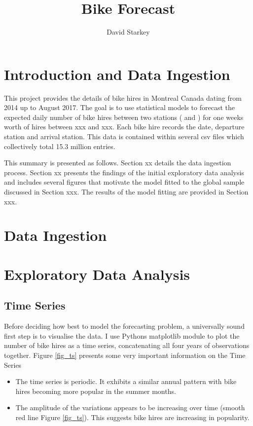 \documentclass[10pt]{article}
\begin{document}
\title{Bike Forecast}

\author{David Starkey}

\maketitle





\section{Introduction and Data Ingestion}
This project provides the details of bike hires in Montreal Canada dating from 2014 up to August 2017. The goal is to use statistical models to forecast the expected daily number of bike hires between two stations ( and ) for one weeks worth of hires between xxx and xxx. Each bike hire records the date, departure station and arrival station. This data is contained within several csv files which collectively total 15.3 million entries.

This summary is presented as follows. Section xx details the data ingestion process. Section xx presents the findings of the initial exploratory data analysis and includes several figures that motivate the model fitted to the global sample discussed in Section xxx. The results of the model fitting are provided in Section xxx.


\section{Data Ingestion}
\label{sec_ingest}



\section{Exploratory Data Analysis}
\label{sec_exp}

\subsection{Time Series}
Before deciding how best to model the forecasting problem, a universally sound first step is to visualise the data. I use Pythons matplotlib module to plot the number of bike hires as a time series, concatenating all four years of observations together. Figure \ref{fig_ts} presents some very important information on the Time Series

\begin{itemize}
\item The time series is periodic. It exhibits a similar annual pattern with bike hires becoming more popular in the summer months.

\item The amplitude of the variations appears to be increasing over time (smooth red line Figure \ref{fig_ts}). This suggests bike hires are increasing in popularity.
\end{itemize}
\end{document}
